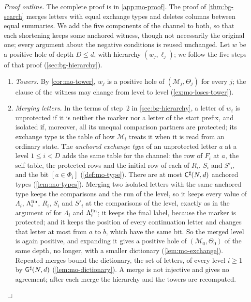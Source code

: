 \begin{proof}[Proof outline]
The complete proof is in \cref{app:mo-proof}. The proof of \cref{thm:bg-search} merges letters
with equal exchange types and deletes columns between equal summaries. We add
the five components of the channel to both, so that each shortening keeps some
anchored witness, though not necessarily the original one; every argument
about the negative conditions is reused unchanged. Let $w$ be a positive hole
of depth $D\le d$, with hierarchy $(w_j,\ell_j)$; we follow the five steps of
that proof (\cref{sec:bg-hierarchy}).
\begin{enumerate}[leftmargin=*]
\item \emph{Towers.} By \cref{cor:mo-tower}, $w_j$ is a positive hole of
  $(\mathcal M_j,\Theta_j)$ for every $j$; the clause of the witness may change
  from level to level (\cref{ex:mo-loses-tower}).
\item \emph{Merging letters.} In the terms of step~2 in \cref{sec:bg-hierarchy},
  a letter of $w_i$ is unprotected if it is neither the marker nor a letter of
  the start prefix, and isolated if, moreover, all its unequal comparison
  partners are protected; its exchange type is the table of how $\mathcal M_i$
  treats it when it is read from an ordinary state. The
  \emph{anchored exchange type} of an unprotected letter $a$ at a level
  $1\le i<D$ adds the same table for the channel: the row of $F_i$ at $a$, the
  self table, the protected rows and the initial row of each of $R_i$, $S_i$
  and $S'_i$, and the bit $[a\in\Phi_i]$ (\cref{def:mo-type}). There are at
  most $\mathsf{C}^{\sharp}(N,d)$ anchored types (\cref{lem:mo-types}). Merging two
  isolated letters with the same anchored type keeps the comparisons and the
  run of the level, so it keeps every value of $\Lambda_i$, $\Lambda^{\mathrm{fin}}_i$, $R_i$,
  $S_i$ and $S'_i$ at the comparisons of the level, exactly as in the
  argument of \citet{Zhao26} for $\Lambda_i$ and $\Lambda^{\mathrm{fin}}_i$; it keeps the final label,
  because the marker is protected; and it keeps the position of every
  continuation letter and changes that letter at most from $a$ to $b$, which
  have the same bit. So the merged level is again positive, and expanding it
  gives a positive hole of $(\mathcal M_0,\Theta_0)$ of the same depth, no
  longer, with a smaller dictionary (\cref{lem:mo-exchange}). Repeated merges
  bound the dictionary, the set of letters, of every level $i\ge1$ by
  $\mathsf{G}^{\sharp}(N,d)$ (\cref{lem:mo-dictionary}). A merge is not injective and
  gives no agreement; after each merge the hierarchy and the towers are
  recomputed.

\end{enumerate}
\end{proof}
